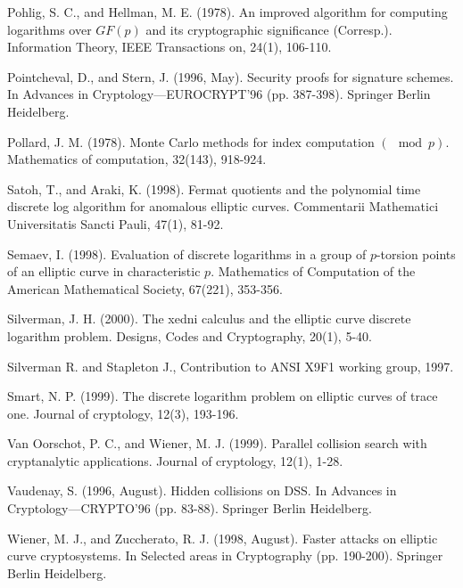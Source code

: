 \documentclass[11pt]{article}
\numberwithin{equation}{section} %
\numberwithin{figure}{section} %
\numberwithin{table}{section} %
\begin{document}
\begin{thebibliography}{99}
	Pohlig, S. C., and Hellman, M. E. (1978). An improved algorithm for computing logarithms over $GF(p)$ and its cryptographic significance (Corresp.). Information Theory, IEEE Transactions on, 24(1), 106-110.

	Pointcheval, D., and Stern, J. (1996, May). Security proofs for signature schemes. In Advances in Cryptology—EUROCRYPT’96 (pp. 387-398). Springer Berlin Heidelberg.

	Pollard, J. M. (1978). Monte Carlo methods for index computation $(\mod p)$. Mathematics of computation, 32(143), 918-924.

	Satoh, T., and Araki, K. (1998). Fermat quotients and the polynomial time discrete log algorithm for anomalous elliptic curves. Commentarii Mathematici Universitatis Sancti Pauli, 47(1), 81-92.

	Semaev, I. (1998). Evaluation of discrete logarithms in a group of $p$-torsion points of an elliptic curve in characteristic $p$. Mathematics of Computation of the American Mathematical Society, 67(221), 353-356.

	Silverman, J. H. (2000). The xedni calculus and the elliptic curve discrete logarithm problem. Designs, Codes and Cryptography, 20(1), 5-40.

	Silverman R. and Stapleton J., Contribution to ANSI X9F1 working group, 1997.

	Smart, N. P. (1999). The discrete logarithm problem on elliptic curves of trace one. Journal of cryptology, 12(3), 193-196.

	Van Oorschot, P. C., and Wiener, M. J. (1999). Parallel collision search with cryptanalytic applications. Journal of cryptology, 12(1), 1-28.

	 Vaudenay, S. (1996, August). Hidden collisions on DSS. In Advances in Cryptology—CRYPTO’96 (pp. 83-88). Springer Berlin Heidelberg.

	Wiener, M. J., and Zuccherato, R. J. (1998, August). Faster attacks on elliptic curve cryptosystems. In Selected areas in Cryptography (pp. 190-200). Springer Berlin Heidelberg.

\end{thebibliography}
\end{document}
